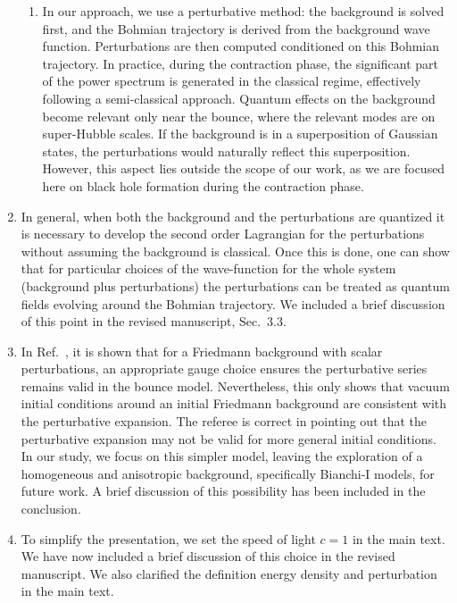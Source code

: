 \documentclass[a4paper,11pt]{article}
\begin{document}
\begin{enumerate}
\begin{enumerate}
              \item In our approach, we use a perturbative method: the background is
                    solved first, and the Bohmian trajectory is derived from the
                    background wave function. Perturbations are then computed
                    conditioned on this Bohmian trajectory. In practice, during the
                    contraction phase, the significant part of the power spectrum is
                    generated in the classical regime, effectively following a
                    semi-classical approach. Quantum effects on the background become
                    relevant only near the bounce, where the relevant modes are on
                    super-Hubble scales. If the background is in a superposition of
                    Gaussian states, the perturbations would naturally reflect this
                    superposition. However, this aspect lies outside the scope of our
                    work, as we are focused here on black hole formation during the
                    contraction phase.

          \end{enumerate}

    \item In general, when both the background and the perturbations are quantized it is necessary
          to develop the second order Lagrangian for the perturbations without assuming the background
          is classical. Once this is done, one can show that for particular choices of the wave-function
          for the whole system (background plus perturbations) the perturbations can be treated as
          quantum fields evolving around the Bohmian trajectory. We included a brief discussion of this
          point in the revised manuscript, Sec.~3.3.

    \item In Ref.~\cite{vitenti2012large}, it is shown that for a Friedmann background with
          scalar perturbations, an appropriate gauge choice ensures the perturbative
          series remains valid in the bounce model. Nevertheless, this only shows that
          vacuum initial conditions around an initial Friedmann background are
          consistent with the perturbative expansion. The referee is correct in pointing
          out that the perturbative expansion may not be valid for more general initial
          conditions. In our study, we focus on this simpler model, leaving the
          exploration of a homogeneous and anisotropic background, specifically
          Bianchi-I models, for future work. A brief discussion of this possibility has
          been included in the conclusion.

    \item To simplify the presentation, we set the speed of light $c=1$ in the main
          text. We have now included a brief discussion of this choice in the revised
          manuscript. We also clarified the definition energy density and perturbation
          in the main text.
\end{enumerate}



\end{document}

